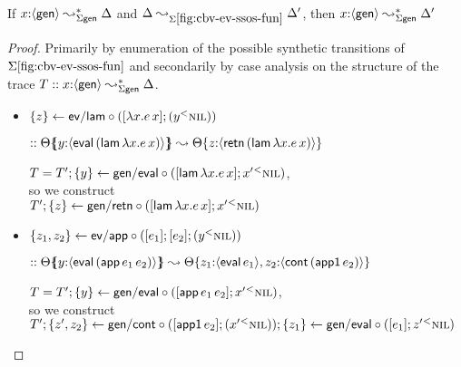 \bigskip
\begin{theorem}\label{thm:adequate-pres}~\\
  If $x{:}\langle {\sf gen} \rangle \leadsto^*_{\Sigma\sf gen} \Delta$ and
  $\Delta \leadsto_{\Sigma\ref{fig:cbv-ev-ssos-fun}} \Delta'$, then
  $x{:} \langle {\sf gen} \rangle \leadsto^*_{\Sigma\sf gen} \Delta'$
\end{theorem}

\begin{proof}
  Primarily by enumeration of the possible synthetic transitions of
  $\Sigma\ref{fig:cbv-ev-ssos-fun}$ and secondarily by case analysis
  on the structure of the trace $T :: x{:}\langle {\sf gen} \rangle
  \leadsto^*_{\Sigma\sf gen} \Delta$.

  \begin{itemize}
  \item $\{{z}\} \leftarrow {\sf ev/lam} \circ {([{\lambda x.e\,x}]; {({y}{^{<}}{\textsc{nil}})})}$

    \qquad $:: {\Theta}\mbox{$\{\hspace{-4pt}\{$}{y{:}\langle {{\sf eval}\,({\sf lam}\,\lambda x.e\,x)} \rangle}\mbox{$\}\hspace{-4pt}\}$}
               \leadsto
               {\Theta}\{{z{:}\langle {{\sf retn}\,({\sf lam}\,\lambda x.e\,x)} \rangle}\} $

    \medskip

    $T = T'; \{{y}\} \leftarrow {\sf gen/eval} \circ {([{{\sf lam}\,\lambda x.e\,x}]; {{x'}{^{<}}{\textsc{nil}}})}$,\\
    so we construct\\
    $T'; \{{z}\} \leftarrow {\sf gen/retn} \circ {([{{\sf lam}\,\lambda x.e\,x}]; {{x'}{^{<}}{\textsc{nil}}})}$

    \medskip

  \item $\{{z_1, z_2}\} \leftarrow {\sf ev/app} \circ {([{e_1}]; {[{e_2}]; {({y}{^{<}}{\textsc{nil}})}})}$

    \qquad $:: {\Theta}\mbox{$\{\hspace{-4pt}\{$}{y{:}\langle {{\sf eval}\,({\sf app}\,e_1\,e_2)} \rangle}\mbox{$\}\hspace{-4pt}\}$}
               \leadsto
               {\Theta}\{{{z_1{:}\langle {{\sf eval}\,e_1} \rangle},{z_2{:}\langle {{\sf cont}\,({\sf app1}\,e_2)} \rangle}}\} $

    \medskip

    $T = T'; \{{y}\} \leftarrow {\sf gen/eval} \circ {([{{\sf app}\,e_1\,e_2}]; {{x'}{^{<}}{\textsc{nil}}})}$,\\
    so we construct\\
    $T'; 
     \{{z', z_2}\} \leftarrow {\sf gen/cont} \circ {([{{\sf app1}\,e_2}]; {({x'}{^{<}}{\textsc{nil}})})};
     \{{z_1}\} \leftarrow {\sf gen/eval} \circ {([{e_1}]; {{z'}{^{<}}{\textsc{nil}}})}$


\end{itemize}
\end{proof}
